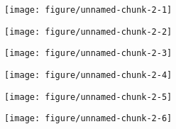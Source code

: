 \documentclass[10pt,a5paper,landscape]{article}\usepackage[]{graphicx}\usepackage[]{color}
\makeatletter
\def\maxwidth{ %
  \ifdim\Gin@nat@width>\linewidth
    \linewidth
  \else
    \Gin@nat@width
  \fi
}
\makeatother
\begin{document}
\texttt{[image: figure/unnamed-chunk-2-1]} 

\newpage

\texttt{[image: figure/unnamed-chunk-2-2]} 

\newpage

\texttt{[image: figure/unnamed-chunk-2-3]} 

\newpage

\texttt{[image: figure/unnamed-chunk-2-4]} 

\newpage

\texttt{[image: figure/unnamed-chunk-2-5]} 

\newpage

\texttt{[image: figure/unnamed-chunk-2-6]} 

\newpage
\end{document}
